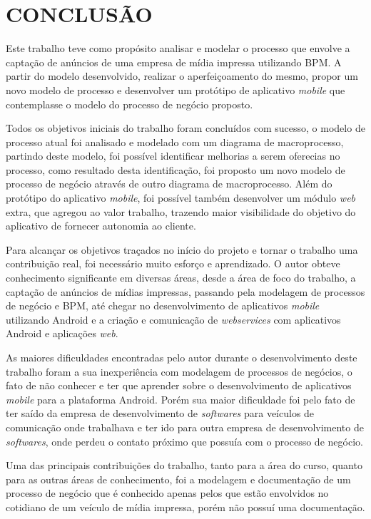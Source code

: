 \documentclass[
	12pt,				%
	openright,			%
	oneside,			%
	a4paper,			%
	chapter=TITLE,		%
	section=TITLE,		%
	english,			%
	french,				%
	spanish,			%
	brazil				%
	]{abntex2}
\begin{document}
\chapter{CONCLUSÃO}

Este trabalho teve como propósito analisar e modelar o processo que envolve a captação de anúncios de uma empresa de mídia impressa utilizando BPM. A partir do modelo desenvolvido, realizar o aperfeiçoamento do mesmo, propor um novo modelo de processo e desenvolver um protótipo de aplicativo \textit{mobile} que contemplasse o modelo do processo de negócio proposto.

Todos os objetivos iniciais do trabalho foram concluídos com sucesso, o modelo de processo atual foi analisado e modelado com um diagrama de macroprocesso, partindo deste modelo, foi possível identificar melhorias a serem oferecias no processo, como resultado desta identificação,  foi proposto um novo modelo de processo de negócio através de outro diagrama de macroprocesso. Além do protótipo do aplicativo \textit{mobile}, foi possível também desenvolver um módulo \textit{web} extra, que agregou ao valor trabalho, trazendo maior visibilidade do objetivo do aplicativo de fornecer autonomia ao cliente.

Para alcançar os objetivos traçados no início do projeto e tornar o trabalho uma contribuição real, foi necessário muito esforço e aprendizado. O autor obteve conhecimento significante em diversas áreas, desde a área de foco do trabalho, a captação de anúncios de mídias impressas, passando pela modelagem de processos de negócio e BPM, até chegar no desenvolvimento de aplicativos \textit{mobile} utilizando Android e a criação e comunicação de \textit{webservices} com aplicativos Android e aplicações \textit{web}.

As maiores dificuldades encontradas pelo autor durante o desenvolvimento deste trabalho foram a sua inexperiência com modelagem de processos de negócios, o fato de não conhecer e ter que aprender sobre o desenvolvimento de aplicativos \textit{mobile} para a plataforma Android. Porém sua maior dificuldade foi pelo fato de ter saído da empresa de desenvolvimento de \textit{softwares} para veículos de comunicação onde trabalhava e ter ido para outra empresa de desenvolvimento de \textit{softwares}, onde perdeu o contato próximo que possuía com o processo de negócio.

Uma das principais contribuições do trabalho, tanto para a área do curso, quanto para as outras áreas de conhecimento, foi a modelagem e documentação de um processo de negócio que é conhecido apenas pelos que estão envolvidos no cotidiano de um veículo de mídia impressa, porém não possuí uma documentação.
\end{document}
